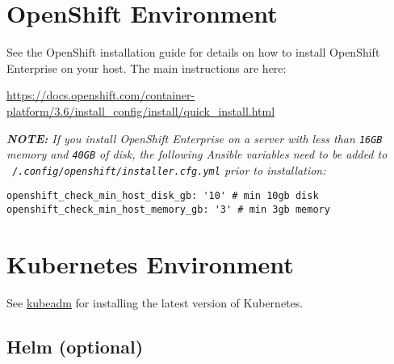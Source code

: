 \documentclass[letterpaper,12pt]{article}
\let\stdsection\section
\renewcommand\section{\newpage\stdsection}
\begin{document}
\section{OpenShift Environment}\label{/_openshift_environment}

See the OpenShift installation guide for details on how to install OpenShift Enterprise on your host. The main instructions are here:

\href{https://docs.openshift.com/container-platform/3.6/install\_config/install/quick\_install.html}{https://docs.openshift.com/container-platform/3.6/install\_config/install/quick\_install.html}

\begin{leftbar}
\textit{\textbf{NOTE: }If you install OpenShift Enterprise on a server with less than \textnormal{\texttt{16GB}} memory and \textnormal{\texttt{40GB}} of disk, the following Ansible variables need to be added to \textnormal{\texttt{~/.config/openshift/installer.cfg.yml}} prior to installation:}
\end{leftbar}
\vspace{.75em}
\begin{lstlisting}
openshift_check_min_host_disk_gb: '10' # min 10gb disk
openshift_check_min_host_memory_gb: '3' # min 3gb memory
\end{lstlisting}

\section{Kubernetes Environment}\label{/_kubernetes_environment}

See \href{https://kubernetes.io/docs/setup/independent/install-kubeadm/}{kubeadm} for installing the latest version of Kubernetes.

\subsection{Helm (optional)}\label{/_kubernetes_environment/_helm_optional}
\end{document}
